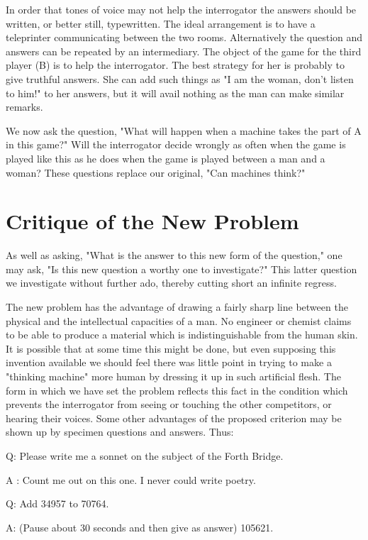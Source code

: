 \documentclass{article}
\begin{document}
In order that tones of voice may not help the interrogator the answers should be written, or better still, typewritten. The ideal arrangement is to have a teleprinter communicating between the two rooms. Alternatively the question and answers can be repeated by an intermediary. The object of the game for the third player (B) is to help the interrogator. The best strategy for her is probably to give truthful answers. She can add such things as "I am the woman, don't listen to him!" to her answers, but it will avail nothing as the man can make similar remarks.

We now ask the question, "What will happen when a machine takes the part of A in this game?" Will the interrogator decide wrongly as often when the game is played like this as he does when the game is played between a man and a woman? These questions replace our original, "Can machines think?"


\section{Critique of the New Problem}

As well as asking, "What is the answer to this new form of the question," one may ask, "Is this new question a worthy one to investigate?" This latter question we investigate without further ado, thereby cutting short an infinite regress.

The new problem has the advantage of drawing a fairly sharp line between the physical and the intellectual capacities of a man. No engineer or chemist claims to be able to produce a material which is indistinguishable from the human skin. It is possible that at some time this might be done, but even supposing this invention available we should feel there was little point in trying to make a "thinking machine" more human by dressing it up in such artificial flesh. The form in which we have set the problem reflects this fact in the condition which prevents the interrogator from seeing or touching the other competitors, or hearing their voices. Some other advantages of the proposed criterion may be shown up by specimen questions and answers. Thus:

Q: Please write me a sonnet on the subject of the Forth Bridge.

A : Count me out on this one. I never could write poetry.

Q: Add 34957 to 70764.

A: (Pause about 30 seconds and then give as answer) 105621.
\end{document}
